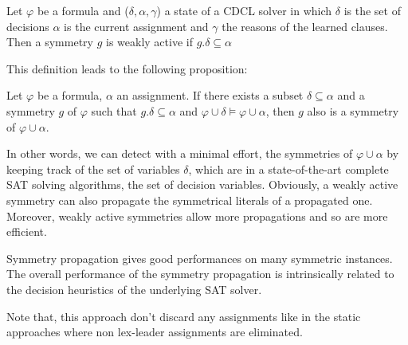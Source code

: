 \begin{definition}
 \label{def:weakly_active_symmetry}
 Let $\varphi$ be a formula and ($\delta, \alpha, \gamma$) a state of a CDCL solver in which $\delta$ is the set of decisions
 $\alpha$ is the current assignment and $\gamma$ the reasons of the learned clauses. Then a symmetry $g$ is weakly active 
 if $g.\delta \subseteq \alpha$
\end{definition}
This definition leads to the following proposition:
\begin{proposition}
 Let $\varphi$ be a formula, $\alpha $ an assignment. If
 there exists a subset $\delta \subseteq \alpha $ and a symmetry $g$ of $\varphi$ such that 
 $g.\delta \subseteq \alpha $ and $\varphi \cup \delta \models \varphi \cup \alpha$, then $g$ 
 also is a symmetry of $\varphi \cup \alpha $.
\end{proposition}


In other words, we can detect with a minimal effort, the symmetries of $\varphi
\cup \alpha$ by keeping track of the set of variables $\delta$, which are 
in a state-of-the-art complete SAT solving algorithms, the set of decision variables.
Obviously, a weakly active symmetry can also propagate the symmetrical literals of a propagated one.
Moreover, weakly active symmetries allow more propagations and so are more efficient.


Symmetry propagation gives good performances on many symmetric instances.
The overall performance of the symmetry propagation is intrinsically related to the decision heuristics of the underlying SAT solver.

Note that, this approach don't discard any assignments like in the static approaches where 
non lex-leader assignments are eliminated.


